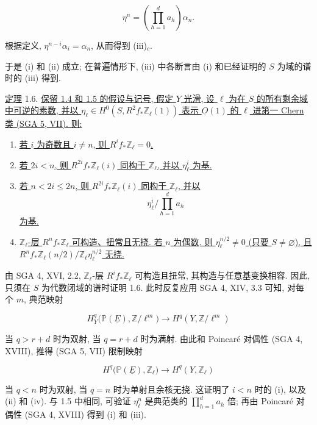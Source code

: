 \begin{equation*}
\eta^n=\left(\prod_{h=1}^d a_h\right)\alpha_n.
\end{equation*}

根据定义, $\eta^{n-i}\alpha_i=\alpha_n$, 从而得到 (iii)$_c$.

于是 (i) 和 (ii) 成立; 在普遍情形下, (iii) 中各断言由 (i) 和已经证明的 $S$ 为域的谱时的 (iii) 得到.

\underline{定理} 1.6. \underline{保留 1.4 和 1.5 的假设与记号, 假定 $Y$ 光滑, 设 $\ell$ 为在 $S$ 的所有剩余域中可逆的素数, 并以 $\eta_\ell\in H^0(S,R^2f_*\mathbb Z_\ell(1))$ 表示 $\underline O(1)$ 的 $\ell$ 进第一 Chern 类 (SGA 5, VII). 则:}

\begin{enumerate}[label=(\roman*),leftmargin=2.6em]
\item \underline{若 $i$ 为奇数且 $i\ne n$, 则 $R^if_*\mathbb Z_\ell=0$.}

\item \underline{若 $2i<n$, 则 $R^{2i}f_*\mathbb Z_\ell(i)$ 同构于 $\mathbb Z_\ell$, 并以 $\eta_\ell^i$ 为基.}

\item \underline{若 $n<2i\leq2n$, 则 $R^{2i}f_*\mathbb Z_\ell(i)$ 同构于 $\mathbb Z_\ell$, 并以}
\begin{equation*}
\eta_\ell^i\bigg/\prod_{h=1}^d a_h
\end{equation*}
\underline{为基.}

\item \underline{$\mathbb Z_\ell$-层 $R^nf_*\mathbb Z_\ell$ 可构造、扭常且无挠. 若 $n$ 为偶数, 则 $\eta_\ell^{n/2}\ne0$ (只要 $S\ne\varnothing$), 且 $R^nf_*\mathbb Z_\ell(n/2)/\mathbb Z_\ell\eta_\ell^{n/2}$ 无挠.}
\end{enumerate}

由 SGA 4, XVI, 2.2, $\mathbb Z_\ell$-层 $R^if_*\mathbb Z_\ell$ 可构造且扭常, 其构造与任意基变换相容. 因此, 只须在 $S$ 为代数闭域的谱时证明 1.6. 此时反复应用 SGA 4, XIV, 3.3 可知, 对每个 $m$, 典范映射

\begin{equation*}
H_Y^q\bigl(\mathbb P(\underline E),\mathbb Z/\ell^m\bigr)
\longrightarrow H^q(Y,\mathbb Z/\ell^m)
\end{equation*}


当 $q>r+d$ 时为双射, 当 $q=r+d$ 时为满射. 由此和 Poincaré 对偶性 (SGA 4, XVIII), 推得 (SGA 5, VII) 限制映射

\begin{equation*}
H^q\bigl(\mathbb P(\underline E),\mathbb Z_\ell\bigr)
\longrightarrow H^q(Y,\mathbb Z_\ell)
\end{equation*}

当 $q<n$ 时为双射, 当 $q=n$ 时为单射且余核无挠. 这证明了 $i<n$ 时的 (i), 以及 (ii) 和 (iv). 与 1.5 中相同, 可验证 $\eta_\ell^n$ 是典范类的 $\prod_{h=1}^d a_h$ 倍; 再由 Poincaré 对偶性 (SGA 4, XVIII) 得到 (i) 和 (iii).

